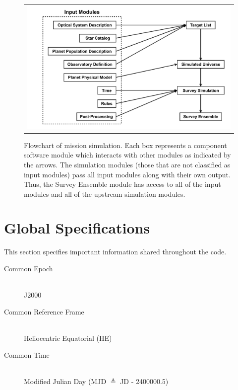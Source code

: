 \documentclass[]{asme2ej}
\begin{document}
\begin{figure}[ht]
    \begin{center}
        \begin{tabular}{c}
            \includegraphics[width=\textwidth]{codeflow2}
        \end{tabular}
   \end{center}
   \caption 
   { \label{fig:codeflow} Flowchart of mission simulation. Each box represents a component software module which interacts with other modules as indicated by the arrows. The simulation modules (those that are not classified as input modules) pass all input modules along with their own output.  Thus, the Survey Ensemble module has access to all of the input modules and all of the upstream simulation modules.} 
\end{figure} 



\section{Global Specifications}
This section specifies important information shared throughout the code.
\begin{description}
    \item[Common Epoch] \hfill \\ J2000
    \item[Common Reference Frame] \hfill \\ Heliocentric Equatorial (HE)
    \item[Common Time] \hfill \\ Modified Julian Day (MJD $\triangleq$ JD - 2400000.5)
\end{description}
\end{document}
